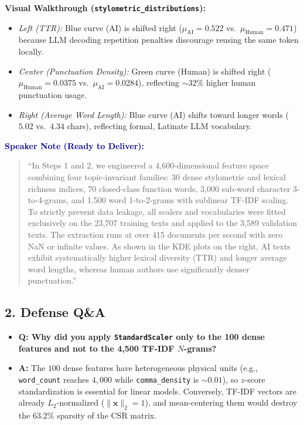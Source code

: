 \documentclass[11pt, a4paper]{article}
\newenvironment{speakernote}{%
    \par\vspace{0.2cm}%
    \noindent\textbf{\textcolor{navy}{Speaker Note (Ready to Deliver):}}\par\vspace{0.1cm}%
    \begin{quote}\itshape\color{slate}%
}{%
    \end{quote}\vspace{0.2cm}%
}
\begin{document}
\noindent\textbf{Visual Walkthrough (\texttt{stylometric\_distributions}):}
\begin{itemize}[noitemsep]
    \item \textit{Left (TTR):} Blue curve (AI) is shifted right ($\mu_{\text{AI}} = 0.522$ vs.\ $\mu_{\text{Human}} = 0.471$) because LLM decoding repetition penalties discourage reusing the same token locally.
    \item \textit{Center (Punctuation Density):} Green curve (Human) is shifted right ($\mu_{\text{Human}} = 0.0375$ vs.\ $\mu_{\text{AI}} = 0.0284$), reflecting $\sim 32\%$ higher human punctuation usage.
    \item \textit{Right (Average Word Length):} Blue curve (AI) shifts toward longer words ($5.02$ vs.\ $4.34$ chars), reflecting formal, Latinate LLM vocabulary.
\end{itemize}

\begin{speakernote}
``In Steps 1 and 2, we engineered a 4,600-dimensional feature space combining four topic-invariant families: 30 dense stylometric and lexical richness indices, 70 closed-class function words, 3,000 sub-word character 3-to-4-grams, and 1,500 word 1-to-2-grams with sublinear TF-IDF scaling. To strictly prevent data leakage, all scalers and vocabularies were fitted exclusively on the 23,707 training texts and applied to the 3,589 validation texts. The extraction runs at over 415 documents per second with zero NaN or infinite values. As shown in the KDE plots on the right, AI texts exhibit systematically higher lexical diversity (TTR) and longer average word lengths, whereas human authors use significantly denser punctuation.''
\end{speakernote}

\subsection*{2. Defense Q\&A}
\begin{itemize}[noitemsep]
    \item \textbf{Q: Why did you apply \texttt{StandardScaler} only to the 100 dense features and not to the 4,500 TF-IDF $N$-grams?}
    \item \textbf{A:} The $100$ dense features have heterogeneous physical units (e.g., \texttt{word\_count} reaches $4,000$ while \texttt{comma\_density} is $\sim 0.01$), so $z$-score standardization is essential for linear models. Conversely, TF-IDF vectors are already $L_2$-normalized ($\|\mathbf{x}\|_2 = 1$), and mean-centering them would destroy the $63.2\%$ sparsity of the CSR matrix.
\end{itemize}
\end{document}
